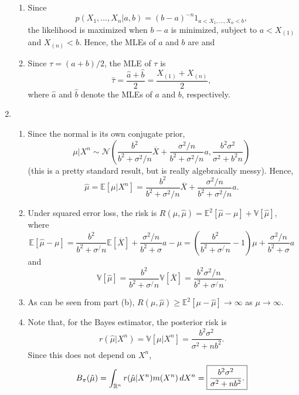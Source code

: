 \documentclass[11pt]{article}
\newcommand{\E}{\mathbb{E}} %
\newcommand{\Var}{\mathbb{V}} %
\newcommand{\R}{\mathbb{R}} %
\newcommand{\ol}{\overline}
\begin{document}
\begin{enumerate}
\begin{enumerate}
\item Since
\[p(X_1,\dots,X_n | a,b) = (b - a)^{-n} 1_{a < X_1,\dots,X_n < b},\]
the likelihood is maximized when $b - a$ is minimized, subject to
$a < X_{(1)}$ and $X_{(n)} < b$. Hence, the MLEs of $a$ and $b$ are
 and 

\item Since $\tau = (a + b)/2$, the MLE of $\tau$ is
\[\hat\tau
    = \frac{\hat a + \hat b}{2}
    = \frac{X_{(1)} + X_{(n)}}{2},
\]
where $\hat a$ and $\hat b$ denote the MLEs of $a$ and $b$, respectively.

\end{enumerate}

\item
\begin{enumerate}
\item Since the normal is its own conjugate prior,
\[\mu | X^n
    \sim \mathcal{N}
        \left( \frac{b^2}{b^2 + \sigma^2/n}\ol X
            + \frac{\sigma^2/n}{b^2 + \sigma^2/n}a,
            \frac{b^2\sigma^2}{\sigma^2 + b^2n} \right)
\]
(this is a pretty standard result, but is really algebraically messy). Hence,
\[\hat\mu
    = \E[\mu | X^n]
    = \frac{b^2}{b^2 + \sigma^2/n}\ol X + \frac{\sigma^2/n}{b^2 + \sigma^2/n}a.
\] 

\item Under squared error loss, the risk is
$R(\mu,\hat\mu) = \E^2[\hat\mu - \mu] + \Var[\hat\mu]$, where
\[\E[\hat\mu - \mu]
    = \frac{b^2}{b^2 + \sigma^/n}\E[\ol X]
    + \frac{\sigma^2/n}{b^2 + \sigma}a - \mu
    = \left( \frac{b^2}{b^2 + \sigma^/n} - 1 \right) \mu
    + \frac{\sigma^2/n}{b^2 + \sigma}a
\]
and
\[\Var[\hat\mu]
    = \frac{b^2}{b^2 + \sigma^/n} \Var[\ol X]
    = \frac{b^2\sigma^2/n}{b^2 + \sigma^/n}.
\]

\item As can be seen from part (b),
$R(\mu,\hat\mu) \geq \E^2[\mu - \hat\mu] \to \infty$ as $\mu \to \infty$.

\item Note that, for the Bayes estimator, the posterior risk is
\[r(\hat\mu | X^n)
    = \Var[\mu | X^n]
    = \frac{b^2\sigma^2}{\sigma^2 + nb^2}.
\]
Since this does not depend on $X^n$,
\[B_\pi(\hat\mu)
    = \int_{\R^n} r(\hat\mu | X^n) m(X^n) \, dX^n
    = \mbox{\fbox{$\displaystyle \frac{b^2\sigma^2}{\sigma^2 + nb^2}$.}}
\]

\end{enumerate}


\end{enumerate}
\end{document}
